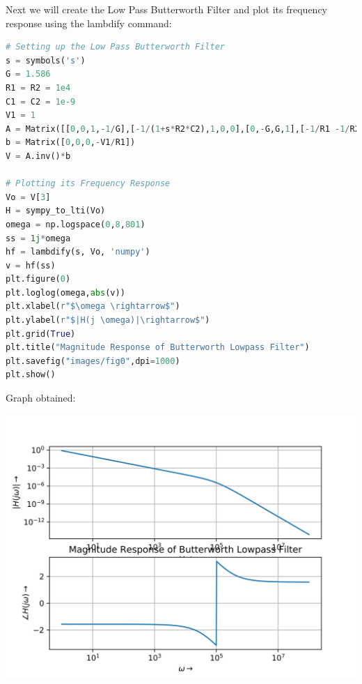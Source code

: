 \documentclass[12pt]{article}
\begin{document}
Next we will create the Low Pass Butterworth Filter and plot its frequency response using the lambdify command:

\begin{lstlisting}[language=Python]
# Setting up the Low Pass Butterworth Filter
s = symbols('s')
G = 1.586
R1 = R2 = 1e4
C1 = C2 = 1e-9
V1 = 1
A = Matrix([[0,0,1,-1/G],[-1/(1+s*R2*C2),1,0,0],[0,-G,G,1],[-1/R1 -1/R2 -s*C1, 1/R2, 0, s*C1]])
b = Matrix([0,0,0,-V1/R1])
V = A.inv()*b

# Plotting its Frequency Response
Vo = V[3]
H = sympy_to_lti(Vo)
omega = np.logspace(0,8,801)
ss = 1j*omega
hf = lambdify(s, Vo, 'numpy')
v = hf(ss)
plt.figure(0)
plt.loglog(omega,abs(v))
plt.xlabel(r"$\omega \rightarrow$")
plt.ylabel(r"$|H(j \omega)|\rightarrow$")
plt.grid(True)
plt.title("Magnitude Response of Butterworth Lowpass Filter")
plt.savefig("images/fig0",dpi=1000)
plt.show()
\end{lstlisting}
\pagebreak
Graph obtained:
\begin{center}
    \includegraphics[scale=0.8]{images/fig0.png}
\end{center}

\pagebreak
\end{document}
